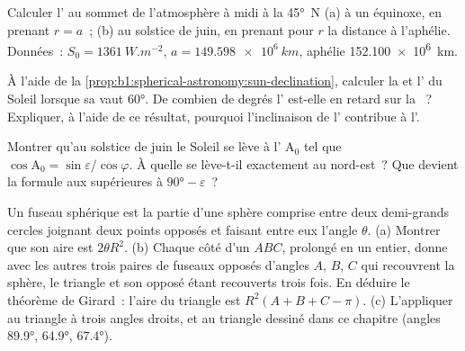 \begin{exercise}[$\star\star$]\label{exo:b1:spherical-astronomy:9}
Calculer l' au sommet de l'atmosphère à midi à la 
\ang{45}~N (a) à un équinoxe, en prenant $r = a$~; (b) au solstice de juin, en
prenant pour $r$ la distance à l'aphélie. Données~: $S_0 = \qty{1361}{W.m^{-2}}$,
$a = \qty{149.598e6}{km}$, aphélie \qty{152.100e6}{km}.
\end{exercise}

\begin{exercise}[$\star\star\star$]\label{exo:b1:spherical-astronomy:10}
À l'aide de la \cref{prop:b1:spherical-astronomy:sun-declination}, calculer la
 et l' du Soleil lorsque sa  
vaut \ang{60}. De combien de degrés l' est-elle en retard sur
la ~? Expliquer, à l'aide de ce résultat, pourquoi l'inclinaison de
l' contribue à l'.
\end{exercise}

\begin{exercise}[$\star\star\star$]\label{exo:b1:spherical-astronomy:11}
Montrer qu'au solstice de juin le Soleil se lève à l' $\mathrm{A}_0$
tel que $\cos\mathrm{A}_0 = \sin\varepsilon/\cos\varphi$. À quelle  se
lève-t-il exactement au nord-est~? Que devient la formule aux 
supérieures à $\ang{90} - \varepsilon$~?
\end{exercise}

\begin{exercise}[$\star\star\star$]\label{exo:b1:spherical-astronomy:12}
Un fuseau sphérique est la partie d'une sphère comprise entre deux demi-grands
cercles joignant deux points opposés et faisant entre eux l'angle $\theta$.
(a) Montrer que son aire est $2\theta R^2$. (b) Chaque côté d'un  $ABC$, prolongé en un  entier, donne avec les autres trois
paires de fuseaux opposés d'angles $A$, $B$, $C$ qui recouvrent la sphère, le
triangle et son opposé étant recouverts trois fois. En déduire le théorème de
Girard~: l'aire du triangle est $R^2(A + B + C - \pi)$. (c) L'appliquer au
triangle à trois angles droits, et au triangle dessiné dans ce chapitre (angles
\ang{89.9}, \ang{64.9}, \ang{67.4}).
\end{exercise}


